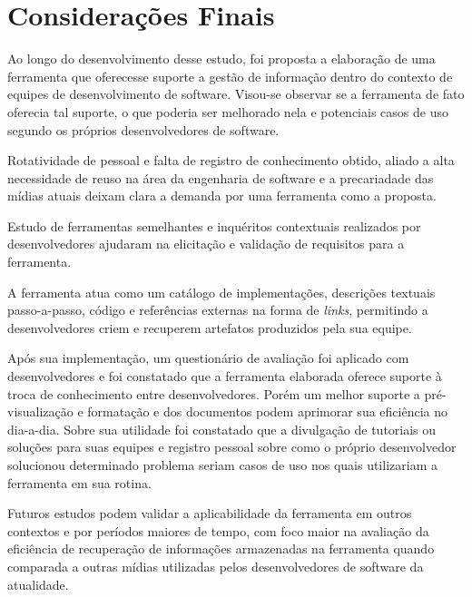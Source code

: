 \chapter{Considerações Finais}

Ao longo do desenvolvimento desse estudo, foi proposta a elaboração de uma ferramenta que oferecesse suporte a gestão de informação dentro do contexto de equipes de desenvolvimento de software. Visou-se observar se a ferramenta de fato oferecia tal suporte, o que poderia ser melhorado nela e potenciais casos de uso segundo os próprios desenvolvedores de software.

Rotatividade de pessoal e falta de registro de conhecimento obtido, aliado a alta necessidade de reuso na área da engenharia de software e a precariadade das mídias atuais deixam clara a demanda por uma ferramenta como a proposta.

Estudo de ferramentas semelhantes e inquéritos contextuais realizados por desenvolvedores ajudaram na elicitação e validação de requisitos para a ferramenta.

A ferramenta atua como um catálogo de implementações, descrições textuais passo-a-passo, código e referências externas na forma de \textit{links}, permitindo a desenvolvedores criem e recuperem artefatos produzidos pela sua equipe.

Após sua implementação, um questionário de avaliação foi aplicado com desenvolvedores e foi constatado que a ferramenta elaborada oferece suporte à troca de conhecimento entre desenvolvedores. Porém um melhor suporte a pré-visualização e formatação e dos documentos podem aprimorar sua eficiência no dia-a-dia. Sobre sua utilidade foi constatado que a divulgação de tutoriais ou soluções para suas equipes e registro pessoal sobre como o próprio desenvolvedor solucionou determinado problema seriam casos de uso nos quais utilizariam a ferramenta em sua rotina.

Futuros estudos podem validar a aplicabilidade da ferramenta em outros contextos e por períodos maiores de tempo, com foco maior na avaliação da eficiência de recuperação de informações armazenadas na ferramenta quando comparada a outras mídias utilizadas pelos desenvolvedores de software da atualidade.
